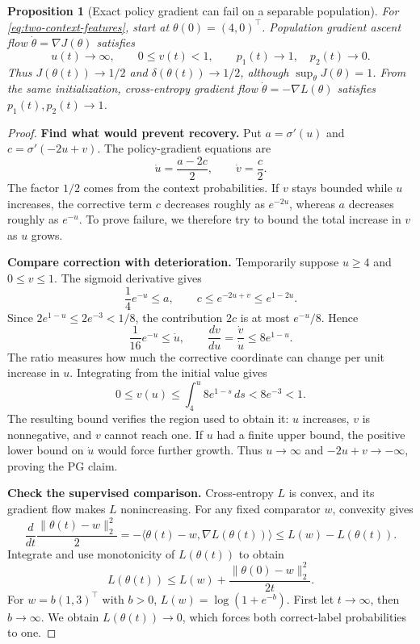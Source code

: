 \documentclass[11pt,twoside]{article}
\newtheorem{proposition}[theorem]{Proposition}
\theoremstyle{definition}
\theoremstyle{remark}
\begin{document}
\begin{proposition}[Exact policy gradient can fail on a separable population]
\label{prop:shared-pg}
For \cref{eq:two-context-features}, start at $\theta(0)=(4,0)^\top$.
Population gradient ascent flow $\dot\theta=\nabla J(\theta)$ satisfies
\[
 u(t)\to\infty,\qquad 0\le v(t)<1,
 \qquad p_1(t)\to1,\quad p_2(t)\to0.
\]
Thus $J(\theta(t))\to1/2$ and $\delta(\theta(t))\to1/2$, although
$\sup_\theta J(\theta)=1$.
From the same initialization, cross-entropy gradient flow
$\dot\theta=-\nabla L(\theta)$ satisfies $p_1(t),p_2(t)\to1$.
\end{proposition}
\begin{proof}
\textbf{Find what would prevent recovery.}
Put $a=\sigma'(u)$ and $c=\sigma'(-2u+v)$. The policy-gradient equations are
\begin{equation}
 \dot u=\frac{a-2c}{2},\qquad \dot v=\frac c2.
 \label{eq:shared-pg-flow}
\end{equation}
The factor $1/2$ comes from the context probabilities. If $v$ stays bounded
while $u$ increases, the corrective term $c$ decreases roughly as $e^{-2u}$,
whereas $a$ decreases roughly as $e^{-u}$. To prove failure, we therefore
try to bound the total increase in $v$ as $u$ grows.

\textbf{Compare correction with deterioration.}
Temporarily suppose $u\ge4$ and $0\le v\le1$. The sigmoid derivative gives
\[
 \frac14e^{-u}\le a,\qquad c\le e^{-2u+v}\le e^{1-2u}.
\]
Since $2e^{1-u}\le2e^{-3}<1/8$, the contribution $2c$ is at most
$e^{-u}/8$. Hence
\[
 \frac1{16}e^{-u}\le\dot u,
 \qquad \frac{dv}{du}=\frac{\dot v}{\dot u}\le8e^{1-u}.
\]
The ratio measures how much the corrective coordinate can change per unit
increase in $u$. Integrating from the initial value gives
\[
 0\le v(u)\le\int_4^u8e^{1-s}\,ds<8e^{-3}<1.
\]
The resulting bound verifies the region used to obtain it: $u$ increases,
$v$ is nonnegative, and $v$ cannot reach one. If $u$ had a finite upper
bound, the positive lower bound on $\dot u$ would force further growth.
Thus $u\to\infty$ and $-2u+v\to-\infty$, proving the PG claim.

\textbf{Check the supervised comparison.}
Cross-entropy $L$ is convex, and its gradient flow makes $L$ nonincreasing.
For any fixed comparator $w$, convexity gives
\[
 \frac{d}{dt}\frac{\|\theta(t)-w\|_2^2}{2}
 =-\langle\theta(t)-w,\nabla L(\theta(t))\rangle
 \le L(w)-L(\theta(t)).
\]
Integrate and use monotonicity of $L(\theta(t))$ to obtain
\[
 L(\theta(t))\le L(w)+\frac{\|\theta(0)-w\|_2^2}{2t}.
\]
For $w=b(1,3)^\top$ with $b>0$, $L(w)=\log(1+e^{-b})$.
First let $t\to\infty$, then $b\to\infty$. We obtain
$L(\theta(t))\to0$, which forces both correct-label probabilities to one.
\end{proof}
\end{document}
